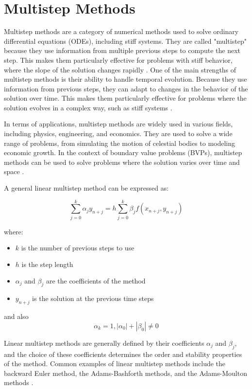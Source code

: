 \section{Multistep Methods}
Multistep methods are a category of numerical methods used to solve ordinary differential equations (ODEs), including stiff systems. They are called "multistep" because they use information from multiple previous steps to compute the next step. This makes them particularly effective for problems with stiff behavior, where the slope of the solution changes rapidly \cite{math7121158}.
One of the main strengths of multistep methods is their ability to handle temporal evolution. Because they use information from previous steps, they can adapt to changes in the behavior of the solution over time. This makes them particularly effective for problems where the solution evolves in a complex way, such as stiff systems \cite{math7121158}.

In terms of applications, multistep methods are widely used in various fields, including physics, engineering, and economics. They are used to solve a wide range of problems, from simulating the motion of celestial bodies to modeling economic growth. In the context of boundary value problems (BVPs), multistep methods can be used to solve problems where the solution varies over time and space \cite{math7121158}.

A general linear multistep method can be expressed as:

\begin{equation}
\sum_{j=0}^{k} \alpha_j y_{n+j} = h \sum_{j=0}^{k} \beta_j f(x_{n+j}, y_{n+j})
\end{equation}

where:


\begin{itemize}
  \item \(k\) is the number of previous steps to use
  \item \(h\) is the step length
  \item \(\alpha_j\) and \(\beta_j\) are the coefficients of the method
  \item \(y_{n+j}\) is the solution at the previous time steps
\end{itemize}


and also \[\alpha_k = 1, |\alpha_0| +| \beta_0 | \neq 0 \]

Linear multistep methods are generally defined by their coefficients \(\alpha_j\) and \(\beta_j\), and the choice of these coefficients determines the order and stability properties of the method. Common examples of linear multistep methods include the backward Euler method, the Adams-Bashforth methods, and the Adams-Moulton methods \cite{lambert1977}.


